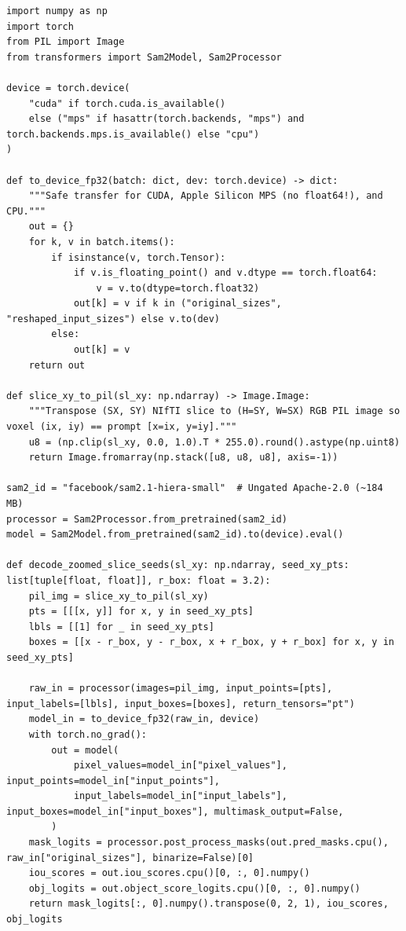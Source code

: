 \documentclass[10.5pt,a4paper]{article}
\begin{document}
\begin{lstlisting}[style=pybmed]
import numpy as np
import torch
from PIL import Image
from transformers import Sam2Model, Sam2Processor

device = torch.device(
    "cuda" if torch.cuda.is_available()
    else ("mps" if hasattr(torch.backends, "mps") and torch.backends.mps.is_available() else "cpu")
)

def to_device_fp32(batch: dict, dev: torch.device) -> dict:
    """Safe transfer for CUDA, Apple Silicon MPS (no float64!), and CPU."""
    out = {}
    for k, v in batch.items():
        if isinstance(v, torch.Tensor):
            if v.is_floating_point() and v.dtype == torch.float64:
                v = v.to(dtype=torch.float32)
            out[k] = v if k in ("original_sizes", "reshaped_input_sizes") else v.to(dev)
        else:
            out[k] = v
    return out

def slice_xy_to_pil(sl_xy: np.ndarray) -> Image.Image:
    """Transpose (SX, SY) NIfTI slice to (H=SY, W=SX) RGB PIL image so voxel (ix, iy) == prompt [x=ix, y=iy]."""
    u8 = (np.clip(sl_xy, 0.0, 1.0).T * 255.0).round().astype(np.uint8)
    return Image.fromarray(np.stack([u8, u8, u8], axis=-1))

sam2_id = "facebook/sam2.1-hiera-small"  # Ungated Apache-2.0 (~184 MB)
processor = Sam2Processor.from_pretrained(sam2_id)
model = Sam2Model.from_pretrained(sam2_id).to(device).eval()

def decode_zoomed_slice_seeds(sl_xy: np.ndarray, seed_xy_pts: list[tuple[float, float]], r_box: float = 3.2):
    pil_img = slice_xy_to_pil(sl_xy)
    pts = [[[x, y]] for x, y in seed_xy_pts]
    lbls = [[1] for _ in seed_xy_pts]
    boxes = [[x - r_box, y - r_box, x + r_box, y + r_box] for x, y in seed_xy_pts]

    raw_in = processor(images=pil_img, input_points=[pts], input_labels=[lbls], input_boxes=[boxes], return_tensors="pt")
    model_in = to_device_fp32(raw_in, device)
    with torch.no_grad():
        out = model(
            pixel_values=model_in["pixel_values"], input_points=model_in["input_points"],
            input_labels=model_in["input_labels"], input_boxes=model_in["input_boxes"], multimask_output=False,
        )
    mask_logits = processor.post_process_masks(out.pred_masks.cpu(), raw_in["original_sizes"], binarize=False)[0]
    iou_scores = out.iou_scores.cpu()[0, :, 0].numpy()
    obj_logits = out.object_score_logits.cpu()[0, :, 0].numpy()
    return mask_logits[:, 0].numpy().transpose(0, 2, 1), iou_scores, obj_logits
\end{lstlisting}
\end{document}
